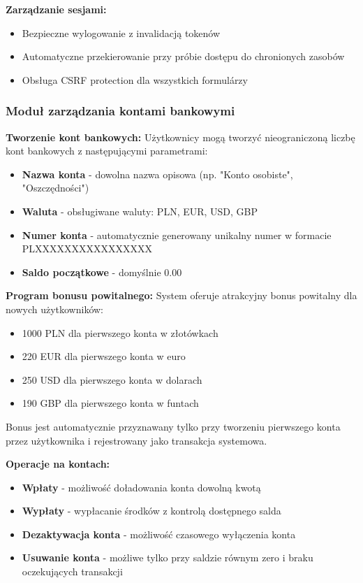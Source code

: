 \documentclass[12pt,a4paper]{article}
\begin{document}
    \textbf{Zarządzanie sesjami:}
    \begin{itemize}
        \item Bezpieczne wylogowanie z invalidacją tokenów
        \item Automatyczne przekierowanie przy próbie dostępu do chronionych zasobów
        \item Obsługa CSRF protection dla wszystkich formulárzy
    \end{itemize}

    \subsubsection{Moduł zarządzania kontami bankowymi}

    \textbf{Tworzenie kont bankowych:}
    Użytkownicy mogą tworzyć nieograniczoną liczbę kont bankowych z następującymi parametrami:
    \begin{itemize}
        \item \textbf{Nazwa konta} - dowolna nazwa opisowa (np. "Konto osobiste", "Oszczędności")
        \item \textbf{Waluta} - obsługiwane waluty: PLN, EUR, USD, GBP
        \item \textbf{Numer konta} - automatycznie generowany unikalny numer w formacie PLXXXXXXXXXXXXXXXX
        \item \textbf{Saldo początkowe} - domyślnie 0.00
    \end{itemize}

    \textbf{Program bonusu powitalnego:}
    System oferuje atrakcyjny bonus powitalny dla nowych użytkowników:
    \begin{itemize}
        \item 1000 PLN dla pierwszego konta w złotówkach
        \item 220 EUR dla pierwszego konta w euro
        \item 250 USD dla pierwszego konta w dolarach
        \item 190 GBP dla pierwszego konta w funtach
    \end{itemize}

    Bonus jest automatycznie przyznawany tylko przy tworzeniu pierwszego konta przez użytkownika i rejestrowany jako transakcja systemowa.

    \textbf{Operacje na kontach:}
    \begin{itemize}
        \item \textbf{Wpłaty} - możliwość doładowania konta dowolną kwotą
        \item \textbf{Wypłaty} - wypłacanie środków z kontrolą dostępnego salda
        \item \textbf{Dezaktywacja konta} - możliwość czasowego wyłączenia konta
        \item \textbf{Usuwanie konta} - możliwe tylko przy saldzie równym zero i braku oczekujących transakcji
    \end{itemize}
\end{document}
